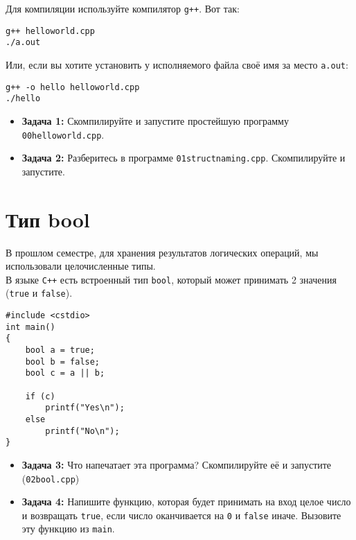 \documentclass{article}
\begin{document}
Для компиляции используйте компилятор \texttt{g++}. Вот так:
\begin{verbatim}
g++ helloworld.cpp
./a.out
\end{verbatim}
Или, если вы хотите установить у исполняемого файла своё имя за место \texttt{a.out}:
\begin{verbatim}
g++ -o hello helloworld.cpp
./hello
\end{verbatim}

\begin{itemize}
\item \textbf{Задача 1:} Скомпилируйте и запустите простейшую программу \texttt{00helloworld.cpp}.
\item \textbf{Задача 2:} Разберитесь в программе \texttt{01structnaming.cpp}. Скомпилируйте и запустите.
\end{itemize}

\section*{Тип bool}
В прошлом семестре, для хранения результатов логических операций, мы использовали целочисленные типы.\\
В языке \texttt{C++} есть встроенный тип \texttt{bool}, который может принимать 2 значения (\texttt{true} и \texttt{false}).
\begin{lstlisting}
#include <cstdio>
int main()
{
	bool a = true;
	bool b = false;
	bool c = a || b;

	if (c)
		printf("Yes\n");
	else
		printf("No\n");
}
\end{lstlisting}
\begin{itemize}
\item \textbf{Задача 3:} Что напечатает эта программа? Скомпилируйте её и запустите (\texttt{02bool.cpp})
\item \textbf{Задача 4:} Напишите функцию, которая будет принимать на вход целое число и возвращать \texttt{true}, если число оканчивается на \texttt{0} и \texttt{false} иначе. Вызовите эту функцию из \texttt{main}.
\end{itemize}

\newpage
\end{document}
